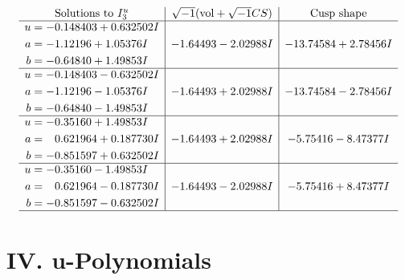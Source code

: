 \documentclass[1p]{elsarticle_modified}
\theoremstyle{definition}
\newcommand{\I}{\sqrt{-1}}
\begin{document}
$$\begin{array}{c|c|c}  
\text{Solutions to }I^u_{3}& \I (\text{vol} + \sqrt{-1}CS) & \text{Cusp shape}\\
 \hline 
\begin{aligned}
u &= -0.148403 + 0.632502 I \\
a &= -1.12196 + 1.05376 I \\
b &= -0.64840 + 1.49853 I\end{aligned}
 & -1.64493 - 2.02988 I & -13.74584 + 2.78456 I \\ \hline\begin{aligned}
u &= -0.148403 - 0.632502 I \\
a &= -1.12196 - 1.05376 I \\
b &= -0.64840 - 1.49853 I\end{aligned}
 & -1.64493 + 2.02988 I & -13.74584 - 2.78456 I \\ \hline\begin{aligned}
u &= -0.35160 + 1.49853 I \\
a &= \phantom{-}0.621964 + 0.187730 I \\
b &= -0.851597 + 0.632502 I\end{aligned}
 & -1.64493 + 2.02988 I & -5.75416 - 8.47377 I \\ \hline\begin{aligned}
u &= -0.35160 - 1.49853 I \\
a &= \phantom{-}0.621964 - 0.187730 I \\
b &= -0.851597 - 0.632502 I\end{aligned}
 & -1.64493 - 2.02988 I & -5.75416 + 8.47377 I\\
 \hline 
 \end{array}$$\newpage
\newpage\renewcommand{\arraystretch}{1}
\centering \section*{ IV. u-Polynomials}
\end{document}
